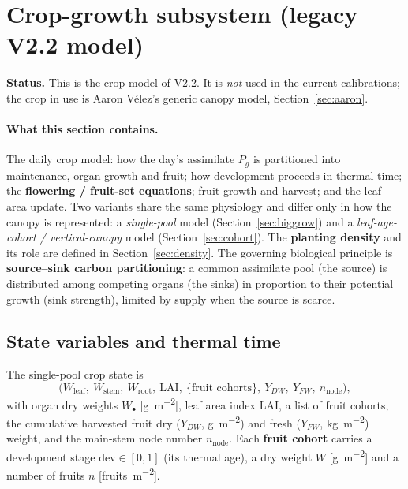 \documentclass[11pt,a4paper]{article}
\begin{document}
\section{Crop-growth subsystem (legacy V2.2 model)}\label{sec:growth}

\noindent\textbf{Status.} This is the crop model of V2.2. It is \emph{not} used in the current calibrations; the crop in use is Aaron V\'elez's generic canopy model, Section~\ref{sec:aaron}.


\paragraph{What this section contains.} The daily crop model: how the day's assimilate $P_g$ is
partitioned into maintenance, organ growth and fruit; how development proceeds in thermal time; the
\textbf{flowering / fruit-set equations}; fruit growth and harvest; and the leaf-area update. Two
variants share the same physiology and differ only in how the canopy is represented: a
\emph{single-pool} model (Section~\ref{sec:biggrow}) and a \emph{leaf-age-cohort / vertical-canopy}
model (Section~\ref{sec:cohort}). The \textbf{planting density} and its role are defined in
Section~\ref{sec:density}. The governing biological principle is \textbf{source--sink carbon
partitioning}: a common assimilate pool (the source) is distributed among competing organs (the
sinks) in proportion to their potential growth (sink strength), limited by supply when the source is
scarce.

\subsection{State variables and thermal time}\label{sec:cropstate}
The single-pool crop state is
\begin{equation}
  \big(W_{\text{leaf}},\ W_{\text{stem}},\ W_{\text{root}},\ \mathrm{LAI},\ \{\text{fruit cohorts}\},\ Y_{DW},\ Y_{FW},\ n_{\text{node}}\big),
\end{equation}
with organ dry weights $W_\bullet$ [\si{g.m^{-2}}], leaf area index LAI, a list of fruit cohorts, the
cumulative harvested fruit dry ($Y_{DW}$, \si{g.m^{-2}}) and fresh ($Y_{FW}$, \si{kg.m^{-2}}) weight,
and the main-stem node number $n_{\text{node}}$. Each \textbf{fruit cohort} carries a development
stage $\mathrm{dev}\in[0,1]$ (its thermal age), a dry weight $W$ [\si{g.m^{-2}}] and a number of
fruits $n$ [\si{fruits.m^{-2}}].
\end{document}

